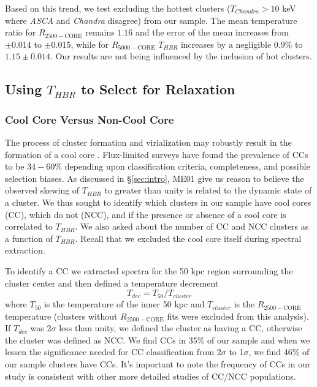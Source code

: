 \documentclass{emulateapj}
\newcommand{\rtwf}{$R_{2500-\text{CORE}}$ }
\newcommand{\rfif}{$R_{5000-\text{CORE}}$ }
\begin{document}
Based on this trend, we test excluding the hottest clusters
($T_{Chandra} > 10$ keV where {\it ASCA} and {\it Chandra} disagree) from our sample.
The mean temperature ratio for \rtwf remains $1.16$ and the error
of the mean increases from $\pm 0.014$ to $\pm 0.015$, while for \rfif
$T_{HBR}$ increases by a negligible $0.9\%$ to $1.15\pm 0.014$. Our results
are not being influenced by the inclusion of hot clusters.

\subsection{Using $T_{HBR}$ to Select for Relaxation} \label{sec:relax}

\subsubsection{Cool Core Versus Non-Cool Core}\label{sec:ccncc}

The process of cluster formation and virialization may robustly result
in the formation of a cool core
\citep{2006ApJ...640..673O,2007arXiv0708.1954B}. Flux-limited surveys
have found the prevalence of CCs to be $34-60\%$ \citep{1997MNRAS.292..419W,
1998MNRAS.298..416P, 2005MNRAS.359.1481B, 2007A&A...466..805C}
depending upon classification criteria, completeness, and possible
selection biases. As discussed in \S\ref{sec:intro}, ME01 give us
reason to believe the observed skewing of $T_{HBR}$ to greater than unity is
related to the dynamic state of a cluster. We thus sought to identify
which clusters in our sample have cool cores (CC), which do not (NCC),
and if the presence or absence of a cool core is correlated to $T_{HBR}$. We
also asked about the number of CC and NCC clusters as a function of
$T_{HBR}$. Recall that we excluded the cool core itself during spectral
extraction.

To identify a CC we extracted spectra for the 50 kpc region
surrounding the cluster center and then defined a temperature
decrement 
\begin{equation}
T_{dec} = T_{50}/T_{cluster}
\label{eqn:tdec}
\end{equation}
where $T_{50}$ is the temperature of the inner 50 kpc and
$T_{cluster}$ is the \rtwf temperature (clusters without \rtwf fits
were excluded from this analysis). If $T_{dec}$ was 2$\sigma$ less than
unity, we defined the cluster as having a CC, otherwise the cluster was
defined as NCC. We find CCs in 35\% of our sample and when we lessen
the significance needed for CC classification from 2$\sigma$ to
1$\sigma$, we find 46\% of our sample clusters have CCs. It's
important to note the frequency of CCs in our study is consistent with
other more detailed studies of CC/NCC populations.
\end{document}
